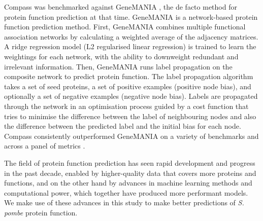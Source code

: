Compass was benchmarked against GeneMANIA \cite{Franz2018}, the de facto method for protein function prediction at that time.
GeneMANIA is a network-based protein function prediction method. First, GeneMANIA combines multiple functional association networks by calculating a weighted average of the adjacency matrices. A ridge regression model (L2 regularised linear regression) is trained to learn the weightings for each network, with the ability to downweight redundant and irrelevant information. Then, GeneMANIA runs label propagation on the composite network to predict protein function. The label propagation algorithm takes a set of seed proteins, a set of positive examples (positive node bias), and optionally a set of negative examples (negative node bias). Labels are propagated through the network in an optimisation process guided by a cost function that tries to minimise the difference between the label of neighbouring nodes and also the difference between the predicted label and the initial bias for each node. Compass consistently outperformed GeneMANIA on a variety of benchmarks and across a panel of metrics \cite{Lehtinen2015}.

The field of protein function prediction has seen rapid development and progress in the past decade, enabled by higher-quality data that covers more proteins and functions, and on the other hand by advances in machine learning methods and computational power, which together have produced more performant models. We make use of these advances in this study to make better predictions of \emph{S. pombe} protein function.

